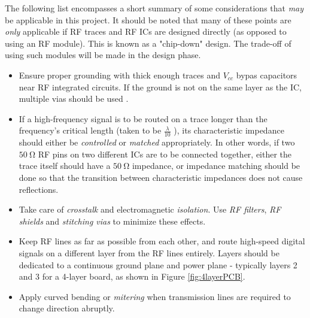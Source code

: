 The following list encompasses a short summary of some considerations that \textit{may} be applicable in this project. It should be noted that many of these points are \textit{only} applicable if RF traces and RF ICs are designed directly (as opposed to using an RF module). This is known as a "chip-down" design. The trade-off of using such modules will be made in the design phase.
\begin{itemize}
    \item Ensure proper grounding with thick enough traces and $V_{cc}$ bypas capacitors near RF integrated circuits. If the ground is not on the same layer as the IC, multiple vias should be used \cite{datasheet-MAX2659}. 
    \item If a high-frequency signal is to be routed on a trace longer than the frequency's critical length (taken to be $\frac{\lambda}{10}$ \cite{site-pcbRoutingGuidelines}), its characteristic impedance should either be \textit{controlled} or \textit{matched} appropriately. In other words, if two $\SI{50}{\ohm}$ RF pins on two different ICs are to be connected together, either the trace itself should have a $\SI{50}{\ohm}$ impedance, or impedance matching should be done so that the transition between characteristic impedances does not cause reflections. \cite{datasheet-MAX2659}
    \item Take care of \textit{crosstalk} and electromagnetic \textit{isolation}. Use \textit{RF filters}, \textit{RF shields} and \textit{stitching vias} to minimize these effects.
    \item Keep RF lines as far as possible from each other, and route high-speed digital signals on a different layer from the RF lines entirely. Layers should be dedicated to a continuous ground plane and power plane - typically layers 2 and 3 for a 4-layer board, as shown in Figure \ref{fig:4layerPCB}. \cite{site-rfPCBGuidelines}
    \item Apply curved bending or \textit{mitering} when transmission lines are required to change direction abruptly. \cite{site-rfPCBGuidelines}
\end{itemize}